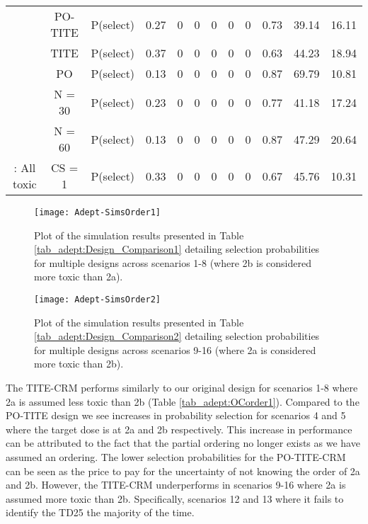 \begin{table}
\begin{singlespace}
{\begin{tabular}[t]{cccccccccccc}
			& PO-TITE & P(select) & 0.27 & 0 & 0 & 0 & 0 & 0 & 0.73 & 39.14 & 16.11\\
			
			& TITE & P(select) & 0.37 & 0 & 0 & 0 & 0 & 0 & 0.63 & 44.23 & 18.94\\
			
			& PO & P(select) & 0.13 & 0 & 0 & 0 & 0 & 0 & 0.87 & 69.79 & 10.81\\
			
			& N = 30 & P(select) & 0.23 & 0 & 0 & 0 & 0 & 0 & 0.77 & 41.18 & 17.24\\
			
			& N = 60 & P(select) & 0.13 & 0 & 0 & 0 & 0 & 0 & 0.87 & 47.29 & 20.64\\
			
			\multirow{-7}{*}{\centering\arraybackslash 16: All toxic} & CS = 1 & P(select) & 0.33 & 0 & 0 & 0 & 0 & 0 & 0.67 & 45.76 & 10.31\\
			\bottomrule
	\end{tabular}}
\end{singlespace}
\end{table}

\begin{figure}[h!]
	\centering
	\caption[Plot of simulations comparing designs for ordering 1.]{Plot of the simulation results presented in Table \ref{tab_adept:Design_Comparison1} detailing selection probabilities for multiple designs across scenarios 1-8 (where 2b is considered more toxic than 2a).}
	\label{fig_adept:sims_order1}
	\texttt{[image: Adept-SimsOrder1]}
\end{figure}

\begin{figure}[h!]
	\centering
	\caption[Plot of simulations comparing designs for ordering 2.]{Plot of the simulation results presented in Table \ref{tab_adept:Design_Comparison2} detailing selection probabilities for multiple designs across scenarios 9-16 (where 2a is considered more toxic than 2b).}
	\label{fig_adept:sims_order2}
	\texttt{[image: Adept-SimsOrder2]}
\end{figure}

The TITE-CRM performs similarly to our original design for scenarios 1-8 where 2a is assumed less toxic than 2b (Table \ref{tab_adept:OCorder1}). Compared to the PO-TITE design we see increases in probability selection for scenarios 4 and 5 where the target dose is at 2a and 2b respectively. This increase in performance can be attributed to the fact that the partial ordering no longer exists as we have assumed an ordering. The lower selection probabilities for the PO-TITE-CRM can be seen as the price to pay for the uncertainty of not knowing the order of 2a and 2b. However, the TITE-CRM underperforms in scenarios 9-16 where 2a is assumed more toxic than 2b. Specifically, scenarios 12 and 13 where it fails to identify the TD25 the majority of the time. 

